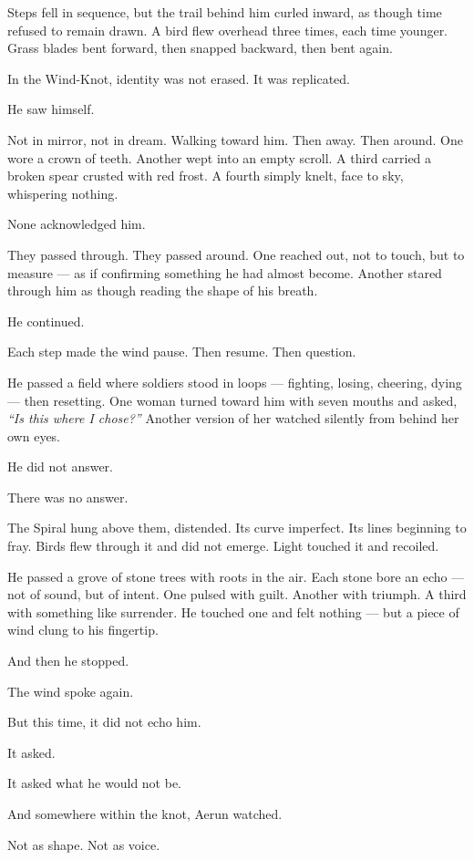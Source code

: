 \documentclass[12pt]{article}
\begin{document}
Steps fell in sequence, but the trail behind him curled inward, as though time refused to remain drawn. A bird flew overhead three times, each time younger. Grass blades bent forward, then snapped backward, then bent again.

In the Wind-Knot, identity was not erased. It was replicated.

He saw himself.

Not in mirror, not in dream. Walking toward him. Then away. Then around. One wore a crown of teeth. Another wept into an empty scroll. A third carried a broken spear crusted with red frost. A fourth simply knelt, face to sky, whispering nothing.

None acknowledged him.

They passed through. They passed around. One reached out, not to touch, but to measure — as if confirming something he had almost become. Another stared through him as though reading the shape of his breath.

He continued.

Each step made the wind pause. Then resume. Then question.

He passed a field where soldiers stood in loops — fighting, losing, cheering, dying — then resetting. One woman turned toward him with seven mouths and asked, \textit{``Is this where I chose?''} Another version of her watched silently from behind her own eyes.

He did not answer.

There was no answer.

The Spiral hung above them, distended. Its curve imperfect. Its lines beginning to fray. Birds flew through it and did not emerge. Light touched it and recoiled.

He passed a grove of stone trees with roots in the air. Each stone bore an echo — not of sound, but of intent. One pulsed with guilt. Another with triumph. A third with something like surrender. He touched one and felt nothing — but a piece of wind clung to his fingertip.

And then he stopped.

The wind spoke again.

But this time, it did not echo him.

It asked.

It asked what he would not be.

And somewhere within the knot, Aerun watched.

Not as shape. Not as voice.
\end{document}
